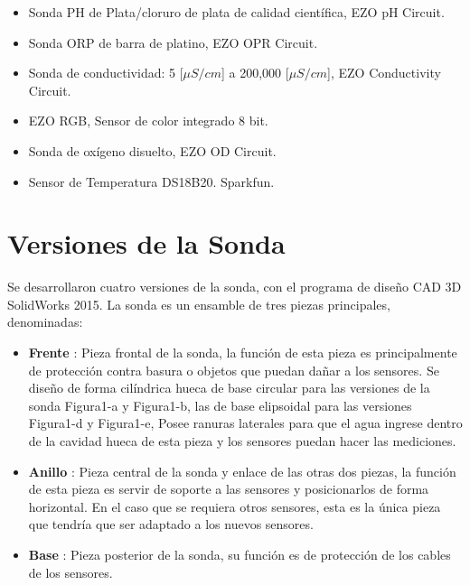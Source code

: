 \begin{appendices}
\begin{itemize}
    \item Sonda PH de Plata/cloruro de plata de calidad científica, EZO pH Circuit.
    \item Sonda ORP de barra de platino, EZO OPR Circuit.
    \item Sonda de conductividad: 5 [\(\mu S/cm\)] a 200,000 [\(\mu S/cm\)], EZO Conductivity Circuit.
    \item EZO RGB, Sensor de color integrado 8 bit.
    \item Sonda de oxígeno disuelto, EZO OD Circuit.
    \item Sensor de Temperatura DS18B20. Sparkfun.
\end{itemize}
    
\section*{Versiones de la Sonda }
Se desarrollaron cuatro versiones de la sonda, con el programa de diseño CAD 3D SolidWorks 2015. La sonda es un ensamble de tres piezas principales, denominadas:

\begin{itemize}
\item \textbf{Frente} : Pieza frontal de la sonda, la función de esta pieza es principalmente de protección contra basura o objetos que puedan dañar a los sensores. Se dise\~no de forma cil\'indrica hueca de base circular para las versiones de la sonda Figura1-a y Figura1-b, las de base elipsoidal para las versiones Figura1-d y Figura1-e, Posee ranuras laterales para que el agua ingrese dentro de la cavidad hueca de esta pieza y los sensores puedan hacer las mediciones.  
\item \textbf{Anillo} : Pieza central de la sonda y enlace de las otras dos piezas, la función de esta pieza es servir de soporte a las sensores y posicionarlos de forma horizontal. En el caso que se requiera otros sensores, esta es la única pieza que tendría que ser adaptado a los nuevos sensores.
\item \textbf{Base}  : Pieza posterior de la sonda, su función es de protección de los cables de los sensores. 
\end{itemize}


\end{appendices}
